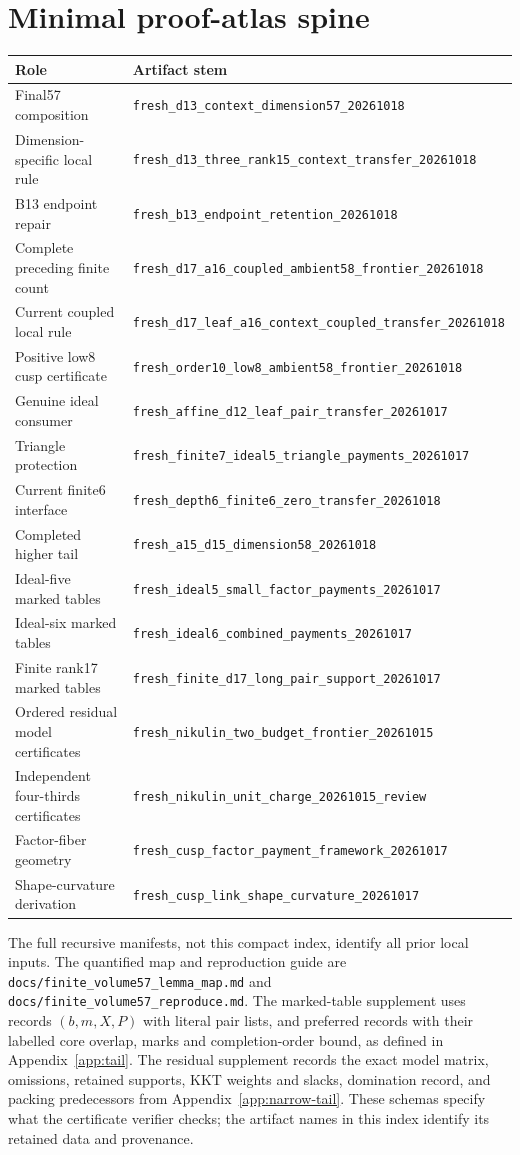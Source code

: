 \documentclass[11pt]{article}
\theoremstyle{remark}\newtheorem{remark}[theorem]{Remark}
\newcommand{\cert}[1]{\nolinkurl{#1}}
\begin{document}
\section{Minimal proof-atlas spine}
\small
\begin{longtable}{p{}p{}}
\toprule Role&Artifact stem\\\midrule
Final57 composition&\cert{fresh_d13_context_dimension57_20261018}\\
Dimension-specific local rule&\cert{fresh_d13_three_rank15_context_transfer_20261018}\\
B13 endpoint repair&\cert{fresh_b13_endpoint_retention_20261018}\\
Complete preceding finite count&\cert{fresh_d17_a16_coupled_ambient58_frontier_20261018}\\
Current coupled local rule&\cert{fresh_d17_leaf_a16_context_coupled_transfer_20261018}\\
Positive low8 cusp certificate&\cert{fresh_order10_low8_ambient58_frontier_20261018}\\
Genuine ideal consumer&\cert{fresh_affine_d12_leaf_pair_transfer_20261017}\\
Triangle protection&\cert{fresh_finite7_ideal5_triangle_payments_20261017}\\
Current finite6 interface&\cert{fresh_depth6_finite6_zero_transfer_20261018}\\
Completed higher tail&\cert{fresh_a15_d15_dimension58_20261018}\\
Ideal-five marked tables&\cert{fresh_ideal5_small_factor_payments_20261017}\\
Ideal-six marked tables&\cert{fresh_ideal6_combined_payments_20261017}\\
Finite rank17 marked tables&\cert{fresh_finite_d17_long_pair_support_20261017}\\
Ordered residual model certificates&\cert{fresh_nikulin_two_budget_frontier_20261015}\\
Independent four-thirds certificates&\cert{fresh_nikulin_unit_charge_20261015_review}\\
Factor-fiber geometry&\cert{fresh_cusp_factor_payment_framework_20261017}\\
Shape-curvature derivation&\cert{fresh_cusp_link_shape_curvature_20261017}\\\bottomrule
\end{longtable}
\normalsize
The full recursive manifests, not this compact index, identify all prior
local inputs. The quantified map and reproduction guide are
\cert{docs/finite_volume57_lemma_map.md} and
\cert{docs/finite_volume57_reproduce.md}.
The marked-table supplement uses records $(b,m,X,P)$ with literal pair
lists, and preferred records with their labelled core overlap, marks and
completion-order bound, as defined in Appendix~\ref{app:tail}.
The residual supplement records the exact model matrix, omissions,
retained supports, KKT weights and slacks, domination record, and
packing predecessors from Appendix~\ref{app:narrow-tail}.
These schemas specify what the certificate verifier checks; the
artifact names in this index identify its retained data and provenance.
\end{document}
